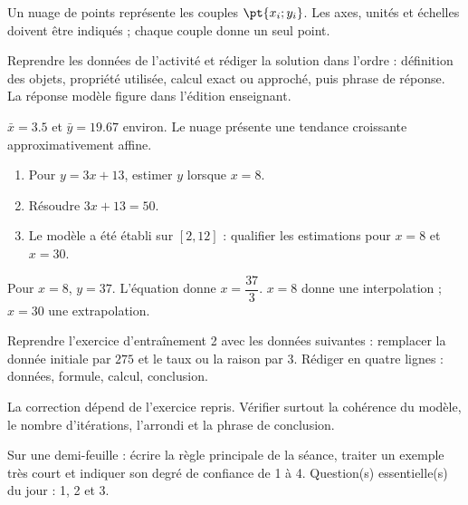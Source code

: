 \begin{summary}Un nuage de points représente les couples $\pt{x_i;y_i}$. Les axes, unités et échelles doivent être indiqués ; chaque couple donne un seul point.\end{summary}

\begin{example}
Reprendre les données de l'activité et rédiger la solution dans l'ordre : définition des objets, propriété utilisée, calcul exact ou approché, puis phrase de réponse. La réponse modèle figure dans l'édition enseignant.
\end{example}
\begin{solution}$\bar x=\num{3,5}$ et $\bar y=\num{19,67}$ environ. Le nuage présente une tendance croissante approximativement affine.\end{solution}

\begin{exercise}[essentiel]
\begin{enumerate}\item Pour $y=3x+13$, estimer $y$ lorsque $x=8$.\item Résoudre $3x+13=50$.\item Le modèle a été établi sur $[2,12]$ : qualifier les estimations pour $x=8$ et $x=30$.\end{enumerate}
\end{exercise}
\begin{solution}Pour $x=8$, $y=37$. L'équation donne $x=\dfrac{37}{3}$. $x=8$ donne une interpolation ; $x=30$ une extrapolation.\end{solution}


\begin{homework}Reprendre l'exercice d'entraînement 2 avec les données suivantes : remplacer la donnée initiale par $275$ et le taux ou la raison par $3$. Rédiger en quatre lignes : données, formule, calcul, conclusion.\end{homework}
\begin{solution}La correction dépend de l'exercice repris. Vérifier surtout la cohérence du modèle, le nombre d'itérations, l'arrondi et la phrase de conclusion.\end{solution}

\begin{exitticket}[3 minutes]Sur une demi-feuille : écrire la règle principale de la séance, traiter un exemple très court et indiquer son degré de confiance de 1 à 4. Question(s) essentielle(s) du jour : 1, 2 et 3.\end{exitticket}

